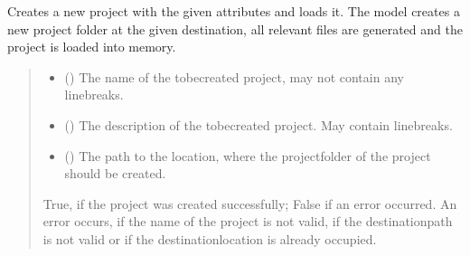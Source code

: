 \documentclass[letterpaper,10pt,english]{sphinxmanual}
\begin{document}
\begin{fulllineitems}
\begin{fulllineitems}
\label{\detokenize{apidoc/src.osm_configurator.control:src.osm_configurator.control.project_controller.ProjectController.create_project}}
\pysigstartsignatures
{}
\pysigstopsignatures
\sphinxAtStartPar
Creates a new project with the given attributes and loads it.
The model creates a new project folder at the given destination, all relevant files are generated and the project is loaded into memory.
\begin{quote}\begin{description}
\begin{itemize}
\item {} 
\sphinxAtStartPar
{} () \textendash{} The name of the to\sphinxhyphen{}be\sphinxhyphen{}created project, may not contain any line\sphinxhyphen{}breaks.

\item {} 
\sphinxAtStartPar
{} () \textendash{} The description of the to\sphinxhyphen{}be\sphinxhyphen{}created project. May contain line\sphinxhyphen{}breaks.

\item {} 
\sphinxAtStartPar
{} () \textendash{} The path to the location, where the project\sphinxhyphen{}folder of the project should be created.

\end{itemize}

\sphinxAtStartPar
True, if the project was created successfully; False if an error occurred. An error occurs, if the name of the project is not valid, if the destination\sphinxhyphen{}path is not valid or if the destination\sphinxhyphen{}location is already occupied.

\sphinxAtStartPar
{}


\end{description}
\end{quote}
\end{fulllineitems}
\end{fulllineitems}
\end{document}
